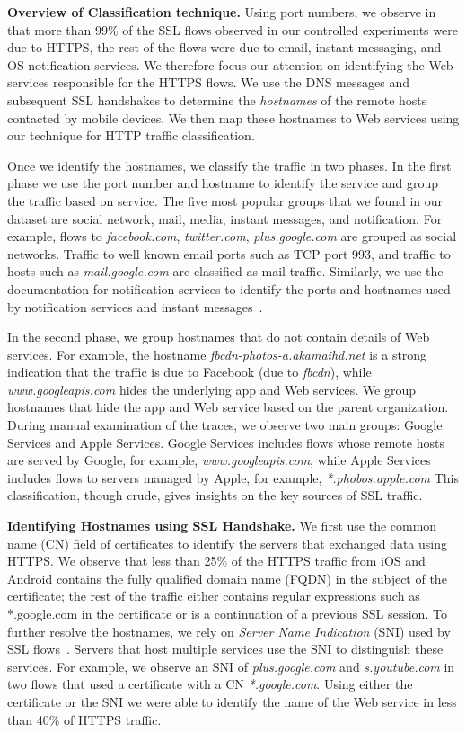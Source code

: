 \noindent\textbf{Overview of Classification technique.}
Using port numbers, we observe in that more than 99\% of the SSL flows observed in our controlled experiments were due to HTTPS, the rest of the flows were due to email, instant messaging, and OS notification services. 
We therefore focus our attention on identifying the Web services responsible for the HTTPS flows.
We use the DNS messages and subsequent SSL handshakes to determine the \emph{hostnames} of the remote hosts contacted by mobile devices.
We then map these hostnames to Web services using our technique for HTTP traffic classification.

Once we identify the hostnames, we classify the traffic in two phases.
In the first phase we use the port number and hostname to identify the service and group the traffic based on service.
The five most popular groups that we found in our dataset are social network, mail, media, instant messages, and notification.
For example, flows to \emph{facebook.com}, \emph{twitter.com}, \emph{plus.google.com} are grouped as social networks.
Traffic to well known email ports such as TCP port 993, and traffic to hosts such as \emph{mail.google.com} are classified as mail traffic.
Similarly, we use the documentation for notification services to identify the ports and hostnames used by notification services and instant messages~\cite{gcm, facebook:mqtt}.

In the second phase, we group hostnames that do not contain details of Web services.
For example, the hostname \emph{fbcdn-photos-a.akamaihd.net} is a strong indication that the traffic is due to Facebook (due to \emph{fbcdn}), while \emph{www.googleapis.com} hides the underlying app and Web services.
We group hostnames that hide the app and Web service based on the parent organization.
During manual examination of the traces, we observe two main groups: Google Services and Apple Services.
Google Services includes flows whose remote hosts are served by Google, for example, \emph{www.googleapis.com}, while Apple Services includes flows to servers managed by Apple, for example, \emph{*.phobos.apple.com}
This classification, though crude, gives insights on the key sources of SSL traffic.

\noindent\textbf{Identifying Hostnames using SSL Handshake.}
We first use the common name (CN) field of certificates to identify the servers that exchanged data using HTTPS.
We observe that less than 25\% of the HTTPS traffic from iOS and Android contains the fully qualified domain name (FQDN) in the subject of the certificate; the rest of the traffic either contains regular expressions such as *.google.com in the certificate or is a continuation of a previous SSL session. 
To further resolve the hostnames, we rely on \emph{Server Name Indication} (SNI) used by SSL flows~\cite{rfc:servernametls}.
Servers that host multiple services use the SNI to distinguish these services.   
For example, we observe an SNI of \emph{plus.google.com} and \emph{s.youtube.com} in two flows that used a certificate with a CN \emph{*.google.com}.
Using either the certificate or the SNI we were able to identify the name of the Web service in less than 40\% of HTTPS traffic.

